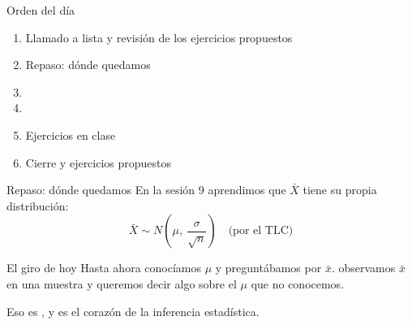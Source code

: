 \documentclass[aspectratio=169,10pt]{beamer}
\begin{document}
\portada

\begin{frame}{Orden del día}
  \begin{enumerate}
    \item Llamado a lista y revisión de los ejercicios propuestos
    \item Repaso: dónde quedamos
    \item {}
    \item {}
    \item Ejercicios en clase
    \item Cierre y ejercicios propuestos
  \end{enumerate}
\end{frame}

\begin{frame}{Repaso: dónde quedamos}
  En la sesión 9 aprendimos que $\bar{X}$ tiene su propia distribución:
  \[ \bar{X}\sim N\!\left(\mu,\ \frac{\sigma}{\sqrt{n}}\right)
     \quad\text{(por el TLC)} \]

  \vspace{0.2cm}
  \begin{alertblock}{El giro de hoy}
    \footnotesize
    Hasta ahora conocíamos $\mu$ y preguntábamos por $\bar{x}$.  observamos $\bar{x}$ en una muestra y queremos
    decir algo sobre el $\mu$ que no conocemos.

    \vspace{0.15cm}
    Eso es , y es el corazón de la inferencia estadística.
  \end{alertblock}
\end{frame}

\end{document}
